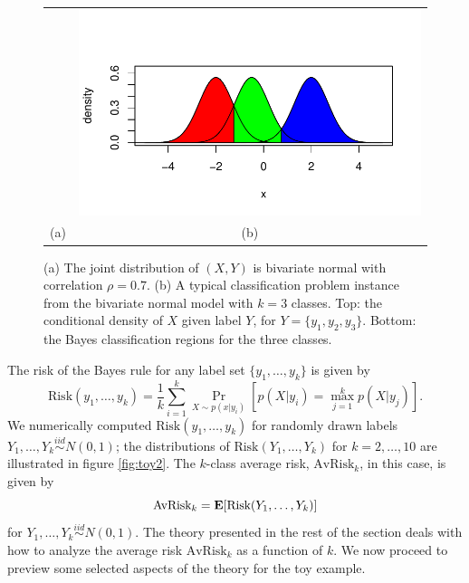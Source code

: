 \documentclass[12pt]{article}
\begin{document}
\begin{figure}[h]
\begin{tabular}{cc}
 &  \includegraphics[scale = 0.5, clip = true, trim = 0 0 0 0.5in]{illus_example1b.pdf}\\
(a) & (b)
\end{tabular}

\caption{
(a) The joint distribution of $(X, Y)$ is bivariate normal with correlation $\rho = 0.7$.
(b) A typical classification problem instance from the bivariate normal model with $k = 3$ classes.
Top: the conditional density of $X$ given label $Y$, for $Y = \{y_1, y_2, y_3\}$.
Bottom: the Bayes classification regions for the three classes.}\label{fig:toy1}
\end{figure}

The risk of the Bayes rule for any label set $\{y_1,\hdots, y_k\}$ is given by
\[
\text{Risk}(y_1,\hdots, y_k) = \frac{1}{k}\sum_{i=1}^k \Pr_{X \sim p(x|y_i)}[p(X|y_i) = \max_{j=1}^k p(X|y_j)].
\]
We numerically computed $\text{Risk}(y_1,\hdots, y_k)$ for randomly
drawn labels $Y_1,\hdots, Y_k \stackrel{iid}{\sim} N(0, 1)$; the
distributions of $\text{Risk}(Y_1,\hdots, Y_k)$ for $k = 2,\hdots, 10$
are illustrated in figure \ref{fig:toy2}.  The $k$-class average risk,
$\text{AvRisk}_k$, in this case, is given by
\[
\text{AvRisk}_k = \textbf{E}[\text{Risk}(Y_1,\hdots, Y_k)]
\]
for $Y_1,\hdots, Y_k \stackrel{iid}{\sim} N(0, 1)$. The theory
presented in the rest of the section deals with how to analyze the
average risk $\text{AvRisk}_k$ as a function of $k$.  We now proceed
to preview some selected aspects of the theory for the toy example.
\end{document}
